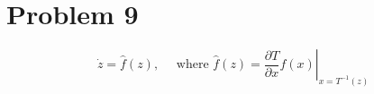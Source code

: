 \section{Problem 9}


$$
\dot{z}=\hat{f}(z), \quad \text { where } \hat{f}(z)=\left.\frac{\partial T}{\partial x} f(x)\right|_{x=T^{-1}(z)}
$$
